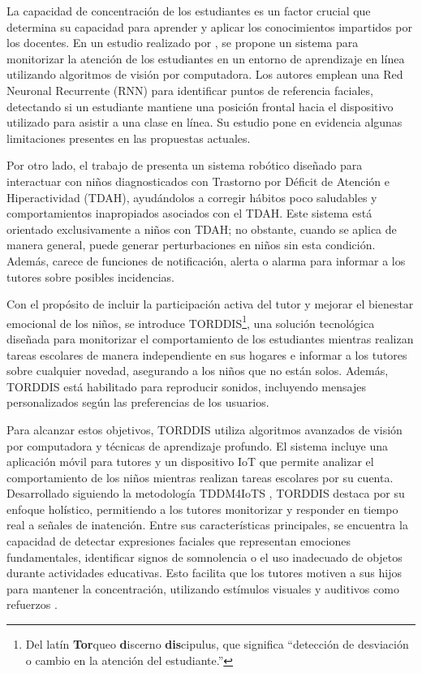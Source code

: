 \documentclass[a4paper,fleqn]{cas-sc}
\begin{document}
		La capacidad de concentración de los estudiantes es un factor crucial que determina su capacidad para aprender y aplicar los conocimientos impartidos por los docentes. En un estudio realizado por \cite{Terraza2022}, se propone un sistema para monitorizar la atención de los estudiantes en un entorno de aprendizaje en línea utilizando algoritmos de visión por computadora. Los autores emplean una Red Neuronal Recurrente (RNN) para identificar puntos de referencia faciales, detectando si un estudiante mantiene una posición frontal hacia el dispositivo utilizado para asistir a una clase en línea. Su estudio pone en evidencia algunas limitaciones presentes en las propuestas actuales.
		
		Por otro lado, el trabajo de \cite{Berrezueta-Guzman2021} presenta un sistema robótico diseñado para interactuar con niños diagnosticados con Trastorno por Déficit de Atención e Hiperactividad (TDAH), ayudándolos a corregir hábitos poco saludables y comportamientos inapropiados asociados con el TDAH. Este sistema está orientado exclusivamente a niños con TDAH; no obstante, cuando se aplica de manera general, puede generar perturbaciones en niños sin esta condición. Además, carece de funciones de notificación, alerta o alarma para informar a los tutores sobre posibles incidencias.
		
		Con el propósito de incluir la participación activa del tutor y mejorar el bienestar emocional de los niños, se introduce TORDDIS\footnote{Del latín \textbf{Tor}queo \textbf{d}iscerno \textbf{dis}cipulus, que significa ``detección de desviación o cambio en la atención del estudiante.''}, una solución tecnológica diseñada para monitorizar el comportamiento de los estudiantes mientras realizan tareas escolares de manera independiente en sus hogares e informar a los tutores sobre cualquier novedad, asegurando a los niños que no están solos. Además, TORDDIS está habilitado para reproducir sonidos, incluyendo mensajes personalizados según las preferencias de los usuarios.
		
		Para alcanzar estos objetivos, TORDDIS utiliza algoritmos avanzados de visión por computadora y técnicas de aprendizaje profundo. El sistema incluye una aplicación móvil para tutores y un dispositivo IoT que permite analizar el comportamiento de los niños mientras realizan tareas escolares por su cuenta. Desarrollado siguiendo la metodología TDDM4IoTS \citep{Guerrero-Ulloa2020TDDM4IoTS}, TORDDIS destaca por su enfoque holístico, permitiendo a los tutores monitorizar y responder en tiempo real a señales de inatención. Entre sus características principales, se encuentra la capacidad de detectar expresiones faciales que representan emociones fundamentales, identificar signos de somnolencia o el uso inadecuado de objetos durante actividades educativas. Esto facilita que los tutores motiven a sus hijos para mantener la concentración, utilizando estímulos visuales y auditivos como refuerzos \citep{Al-Gburi2023,Enadula2021,Terraza2022}.
		
\end{document}
